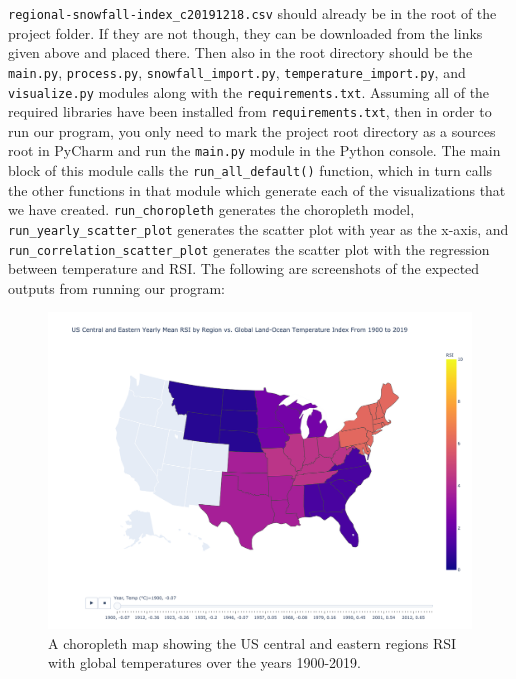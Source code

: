 \documentclass[fontsize=11pt]{article}
\begin{document}
\noindent \texttt{regional-snowfall-index\_c20191218.csv} should already be in the root of the project folder. If they are not though, they can be downloaded from the links given above and placed there. Then also in the root directory should be the \texttt{main.py}, \texttt{process.py}, \texttt{snowfall\_import.py}, \texttt{temperature\_import.py}, and \texttt{visualize.py} modules along with the \texttt{requirements.txt}. Assuming all of the required libraries have been installed from \texttt{requirements.txt}, then in order to run our program, you only need to mark the project root directory as a sources root in PyCharm and run the \texttt{main.py} module in the Python console. The main block of this module calls the \texttt{run\_all\_default()} function, which in turn calls the other functions in that module which generate each of the visualizations that we have created. \texttt{run\_choropleth} generates the choropleth model, \texttt{run\_yearly\_scatter\_plot} generates the scatter plot with year as the x-axis, and \texttt{run\_correlation\_scatter\_plot} generates the scatter plot with the regression between temperature and RSI. 
The following are screenshots of the expected outputs from running our program:\\
\begin{figure}[h]
    \centering
    \includegraphics[scale=.35]{choropleth.png}
    \caption{A choropleth map showing the US central and eastern regions RSI with global temperatures over the years 1900-2019.}
    \label{fig:my_label}
\end{figure}

\newpage
\end{document}

